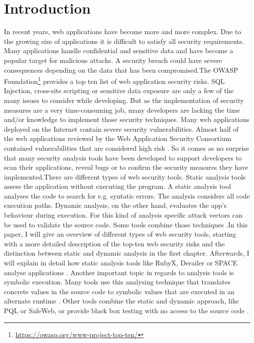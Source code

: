 \section{Introduction}
\label{section:Introduction}
In recent years, web applications have become more and more complex. Due to the growing size of applications it is difficult to satisfy all security requirements. Many applications handle confidential and sensitive data and have become a popular target for malicious attacks. A security breach could have severe consequences depending on the data that has been compromised.\newline The OWASP Foundation\footnote{ \url{https://owasp.org/www-project-top-ten/}} provides a top ten list of web application security risks. SQL Injection, cross-site scripting or sensitive data exposure are only a few of the many issues to consider while developing. But as the implementation of security measures are a very time-consuming job, many developers are lacking the time and/or knowledge to implement those security techniques. Many web applications deployed on the Internet contain severe security vulnerabilities. Almost half of the web applications reviewed by the Web Application Security Consortium contained vulnerabilities that are considered high risk \autocite[2]{Li2014}.
So it comes as no surprise that many security analysis tools have been developed to support developers to scan their applications, reveal bugs or to confirm the security measures they have implemented.\newline There are different types of web security tools. Static analysis tools assess the application without executing the program. A static analysis tool analyses the code to search for e.g. syntatic errors. The analysis considers all code execution paths. Dynamic analysis, on the other hand, evaluates the app's behaviour during execution. For this kind of analysis specific attack vectors can be used to validate the source code. Some tools combine those techniques \autocite[]{Lam2008,Hosek2011}.\newline In this paper, I will give an overview of different types of web security tools, starting with a more detailed description of the top-ten web security risks and the distinction between static and dynamic analysis in the first chapter. Afterwards, I will explain in detail how static analysis tools like RubyX, Derailer or SPACE analyse applications \autocite[]{Chaudhuri2010, Near2014, Near2016}. Another important topic in regards to analysis tools is symbolic execution. Many tools use this analysing technique that translates concrete values in the source code to symbolic values that are executed in an alternate runtime \autocite[]{Bocic2017,Near2016,Near2012}. Other tools combine the static and dynamic approach, like PQL or SafeWeb, or provide black box testing with no access to the source code \autocite[]{Lam2008,Hosek2011,Araujo2018}.




